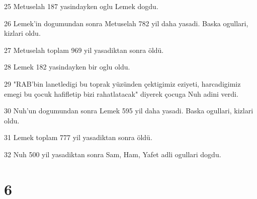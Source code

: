 \par 25 Metuselah 187 yasindayken oglu Lemek dogdu.
\par 26 Lemek'in dogumundan sonra Metuselah 782 yil daha yasadi. Baska ogullari, kizlari oldu.
\par 27 Metuselah toplam 969 yil yasadiktan sonra öldü.
\par 28 Lemek 182 yasindayken bir oglu oldu.
\par 29 "RAB'bin lanetledigi bu toprak yüzünden çektigimiz eziyeti, harcadigimiz emegi bu çocuk hafifletip bizi rahatlatacak" diyerek çocuga Nuh adini verdi.
\par 30 Nuh'un dogumundan sonra Lemek 595 yil daha yasadi. Baska ogullari, kizlari oldu.
\par 31 Lemek toplam 777 yil yasadiktan sonra öldü.
\par 32 Nuh 500 yil yasadiktan sonra Sam, Ham, Yafet adli ogullari dogdu.

\chapter{6}

